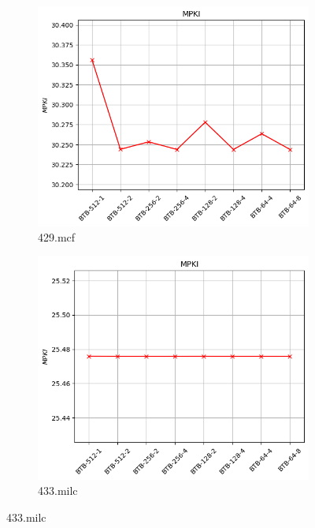 \documentclass{article}
\begin{document}
\begin{figure}[H]
    \centering
    \ContinuedFloat

    \begin{subfigure}[b]{0.45\textwidth}
        \includegraphics[width=\textwidth]{figures/5_4/429.mcf.cslab_branch_preds_ref.out.png}
        \caption{429.mcf}
        \label{fig:plot53}
    \end{subfigure}
    \hfill
    \begin{subfigure}[b]{0.45\textwidth}
        \includegraphics[width=\textwidth]{figures/5_4/433.milc.cslab_branch_preds_ref.out.png}
        \caption{433.milc}
        \label{fig:plot54}
    \end{subfigure}


\end{figure}
\end{document}
